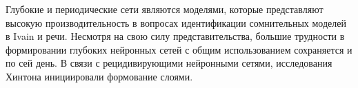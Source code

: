 \begin{frame}

    Глубокие и периодические сети являются моделями, которые представляют высокую производительность
    в вопросах идентификации сомнительных моделей в Ivain и речи. Несмотря на свою силу представительства,
    большие трудности в формировании глубоких нейронных сетей с общим использованием сохраняется и по сей день.
    В связи с рецидивирующими нейронными сетями, исследования Хинтона инициировали формование слоями.

\end{frame}
